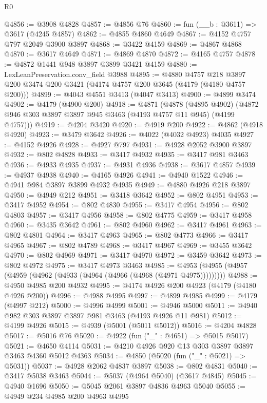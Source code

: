\begin{lexlean}{R0}
\begin{coremodule}
@4856 := @3908 @4828
@4857 := @4856 @76
@4860 := fun (__b : @3611) => @3617 (@4245 @4857)
@4862 := @4855 @4860 @4649
@4867 := @4152 @4757 @797 @2049 @3900 @3897
@4868 := @3422 @4159
@4869 := @4867 @4868
@4870 := @3617 @4649
@4871 := @4869 @4870
@4872 := @4165 @4757
@4878 := @4872 @1441 @948 @3897 @3899 @3421 @4159
@4880 := LexLeanPreservation.conv_field @3988
@4895 := @4880
    @4757
    @218
    @3897
    @200
    @3474
    @200
    @3421
    (@4174 @4757 @200 @3645 (@4179 (@4180 @4757 @200)))
@4899 := @4043 @4551 @3413 (@4047 @3413)
@4900 := @4899 @3474
@4902 := @4179 (@4900 @200)
@4918 := @4871
    (@4878
      (@4895 @4902)
      (@4872 @946 @303 @3897 @3897 @945 @3463 (@4193 @4757 @11 @945) (@4199 @4757)))
@4919 := @4204 @3420
@4920 := @4919 @200
@4922 := @4862 (@4918 @4920)
@4923 := @3479 @3642
@4926 := @4022 (@4032 @4923) @4035
@4927 := @4152 @4926
@4928 := @4927 @797
@4931 := @4928 @2052 @3900 @3897
@4932 := @802 @4828
@4933 := @3417 @4932
@4935 := @3417 @981 @3463
@4936 := @4933 @4935
@4937 := @4931 @4936
@4938 := @3617 @4857
@4939 := @4937 @4938
@4940 := @4165 @4926
@4941 := @4940 @1522
@4946 := @4941 @984 @3897 @3899 @4932 @4935
@4949 := @4880 @4926 @218 @3897
@4950 := @4949 @212
@4951 := @3418 @3642
@4952 := @802 @4951
@4953 := @3417 @4952
@4954 := @802 @4830
@4955 := @3417 @4954
@4956 := @802 @4803
@4957 := @3417 @4956
@4958 := @802 @4775
@4959 := @3417 @4958
@4960 := @3435 @3642
@4961 := @802 @4960
@4962 := @3417 @4961
@4963 := @802 @4801
@4964 := @3417 @4963
@4965 := @802 @4773
@4966 := @3417 @4965
@4967 := @802 @4789
@4968 := @3417 @4967
@4969 := @3455 @3642
@4970 := @802 @4969
@4971 := @3417 @4970
@4972 := @3459 @3642
@4973 := @802 @4972
@4975 := @3417 @4973 @3463
@4985 := @4953 (@4955 (@4957 (@4959 (@4962 (@4933 (@4964 (@4966 (@4968 (@4971 @4975)))))))))
@4988 := @4950 @4985 @200 @4932
@4995 := @4174 @4926 @200 @4923 (@4179 (@4180 @4926 @200))
@4996 := @4988 @4995
@4997 := @4899 @4985
@4999 := @4179 (@4997 @212)
@5000 := @4996 @4999
@5001 := @4946 @5000
@5011 := @4940 @982 @303 @3897 @3897 @981 @3463 (@4193 @4926 @11 @981)
@5012 := @4199 @4926
@5015 := @4939 (@5001 (@5011 @5012))
@5016 := @4204 @4828
@5017 := @5016 @76
@5020 := @4922 (fun ("_" : @4651) => @5015 @5017)
@5021 := @4650 @4114
@5031 := @4210 @4926 @920 @13 @303 @3897 @3897 @3463 @4360 @5012 @4363
@5034 := @4850 (@5020 (fun ("_" : @5021) => @5031))
@5037 := @4928 @2062 @4837 @3897
@5038 := @802 @4831
@5040 := @3417 @5038 @3463
@5044 := @5037 (@4964 @5040) (@3617 @4845)
@5045 := @4940 @1696
@5050 := @5045 @2061 @3897 @4836 @4963 @5040
@5055 := @4949 @234 @4985 @200 @4963 @4995

\end{coremodule}
\end{lexlean}
